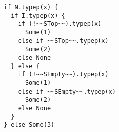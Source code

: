 \begin{lstlisting}[style=scalaioScala]
if N.typep(x) {
  if I.typep(x) {
    if (!~~STop~~).typep(x)
      Some(1)
    else if ~~STop~~.typep(x)
      Some(2)
    else None
  } else {
    if (!~~SEmpty~~).typep(x)
      Some(1)
    else if ~~SEmpty~~.typep(x)
      Some(2)
    else None
  }
} else Some(3)
\end{lstlisting}
